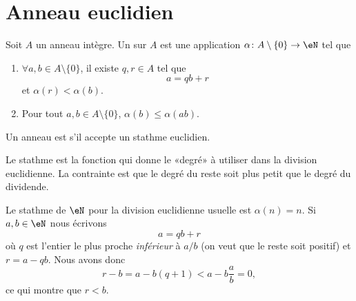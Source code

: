 
\section{Anneau euclidien}

\begin{definition} \label{DefAXitWRL}
    Soit \( A\) un anneau intègre. Un  sur \( A\) est une application \( \alpha\colon A\setminus\{ 0 \}\to \eN\) tel que
    \begin{enumerate}
        \item       \label{ITEMooLVJAooLpjgEz}
            \( \forall a,b\in A\setminus\{ 0 \}\), il existe \( q,r\in A\) tel que
            \begin{equation}
                a=qb+r
            \end{equation}
            et \( \alpha(r)<\alpha(b)\).
        \item
            Pour tout \( a,b\in A\setminus\{ 0 \}\), \( \alpha(b)\leq \alpha(ab)\).
    \end{enumerate}
    Un anneau est  s'il accepte un stathme euclidien.
\end{definition}
Le stathme est la fonction qui donne le «degré» à utiliser dans la division euclidienne. La contrainte est que le degré du reste soit plus petit que le degré du dividende.

\begin{example} \label{ExwqlCwvV}
    Le stathme de \( \eN\) pour la division euclidienne usuelle est \( \alpha(n)=n\). Si \( a,b\in \eN\) nous écrivons
    \begin{equation}
        a=qb+r
    \end{equation}
    où \( q\) est l'entier le plus proche \emph{inférieur} à \( a/b\) (on veut que le reste soit positif) et \( r=a-qb\). Nous avons donc
    \begin{equation}
        r-b=a-b(q+1)<a-b\frac{ a }{ b }=0,
    \end{equation}
    ce qui montre que \( r<b\).
\end{example}

